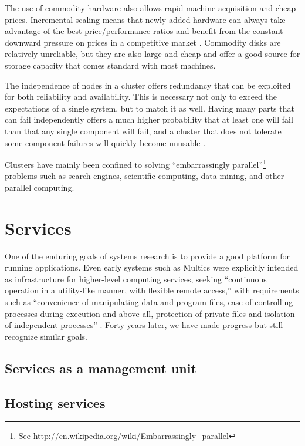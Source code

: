 The use of commodity hardware also allows rapid machine acquisition and cheap prices. Incremental scaling means that newly added hardware can always take advantage of the best price/performance ratios and benefit from the constant downward pressure on prices in a competitive market \cite{fox}. Commodity disks are relatively unreliable, but they are also large and cheap and offer a good source for storage capacity \cite{patterson,warfield} that comes standard with most machines.

The independence of nodes in a cluster offers redundancy that can be exploited for both reliability and availability. This is necessary not only to exceed the expectations of a single system, but to match it as well. Having many parts that can fail independently offers a much higher probability that at least one will fail than that any single component will fail, and a cluster that does not tolerate some component failures will quickly become unusable \cite{birrell93}.

Clusters have mainly been confined to solving ``embarrassingly parallel''\footnote{See \url{http://en.wikipedia.org/wiki/Embarrassingly_parallel}} problems such as search engines, scientific computing, data mining, and other parallel computing.

\section{Services}

One of the enduring goals of systems research is to provide a good platform for running applications. Even early systems such as Multics were explicitly intended as infrastructure for higher-level computing services, seeking ``continuous operation in a utility-like manner, with flexible remote access,'' with requirements such as ``convenience of manipulating data and program files, ease of controlling processes during execution and above all, protection of private files and isolation of independent processes'' \cite{corbato}. Forty years later, we have made progress but still recognize similar goals.

\subsection{Services as a management unit}

\subsection{Hosting services}

